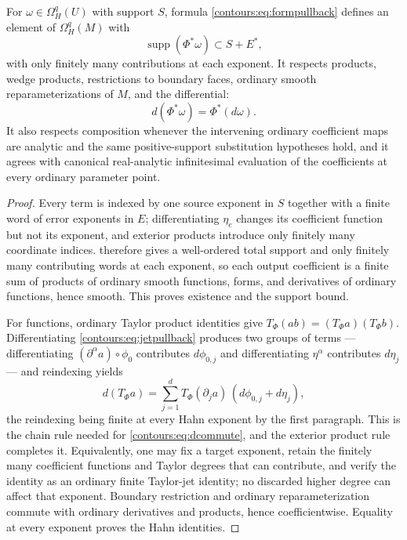 \documentclass[11pt,letterpaper]{article}
\theoremstyle{definition}
\theoremstyle{remark}
\newcommand{\supp}{\operatorname{supp}}\newcommand{\Res}{\operatorname{Res}}
\numberwithin{equation}{section}
\begin{document}
\begin{lemma}
\label{contours:lem:pullback}
For $\omega\in\Omega_H^q(U)$ with support $S$, formula
\eqref{contours:eq:formpullback} defines an element of $\Omega_H^q(M)$ with
\[
  \supp(\Phi^*\omega)\subset S+E^* ,
\]
with only finitely many contributions at each exponent. It respects products, wedge
products, restrictions to boundary faces, ordinary smooth reparameterizations of
$M$, and the differential:
\begin{equation}\label{contours:eq:dcommute}
  d(\Phi^*\omega)=\Phi^*(d\omega).
\end{equation}
It also respects composition whenever the intervening ordinary coefficient maps are
analytic and the same positive-support substitution hypotheses hold, and it agrees
with canonical real-analytic infinitesimal evaluation of the coefficients at every
ordinary parameter point.
\end{lemma}
\begin{proof}
Every term is indexed by one source exponent in $S$ together with a finite word of
error exponents in $E$; differentiating $\eta_e$ changes its coefficient function
but not its exponent, and exterior products introduce only finitely many coordinate
indices.  therefore gives a well-ordered total support
and only finitely many contributing words at each exponent, so each output
coefficient is a finite sum of products of ordinary smooth functions, forms, and
derivatives of ordinary functions, hence smooth. This proves existence and the
support bound.

For functions, ordinary Taylor product identities give $T_\Phi(ab)=(T_\Phi a)
(T_\Phi b)$. Differentiating \eqref{contours:eq:jetpullback} produces two groups of
terms --- differentiating $(\partial^\alpha a)\circ\phi_0$ contributes $d\phi_{0,j}$
and differentiating $\eta^\alpha$ contributes $d\eta_j$ --- and reindexing yields
\[
  d(T_\Phi a)=\sum_{j=1}^dT_\Phi(\partial_ja)\,(d\phi_{0,j}+d\eta_j),
\]
the reindexing being finite at every Hahn exponent by the first paragraph. This is
the chain rule needed for \eqref{contours:eq:dcommute}, and the exterior product
rule completes it. Equivalently, one may fix a target exponent, retain the finitely
many coefficient functions and Taylor degrees that can contribute, and verify the
identity as an ordinary finite Taylor-jet identity; no discarded higher degree can
affect that exponent. Boundary restriction and ordinary reparameterization commute
with ordinary derivatives and products, hence coefficientwise. Equality at every
exponent proves the Hahn identities.
\end{proof}
\end{document}
